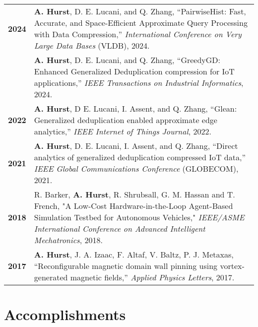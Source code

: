\documentclass[a4paper,11pt]{article}
\begin{document}
\noindent
\begin{tabular}{p{}p{}}
    \textbf{2024} & \textbf{A. Hurst}, D. E. Lucani, and Q. Zhang, “PairwiseHist: Fast, Accurate, and Space-Efficient Approximate Query Processing with Data Compression,” \textit{International Conference on Very Large Data Bases} (VLDB), 2024. \\

     & \textbf{A. Hurst}, D. E. Lucani, and Q. Zhang, “GreedyGD: Enhanced Generalized Deduplication compression for IoT applications,” \textit{IEEE Transactions on Industrial Informatics}, 2024. \\

    \textbf{2022} & \textbf{A. Hurst}, D E. Lucani, I. Assent, and Q. Zhang, “Glean: Generalized deduplication enabled approximate edge analytics,” \textit{IEEE Internet of Things Journal}, 2022. \\

    \textbf{2021} & \textbf{A. Hurst}, D. E. Lucani, I. Assent, and Q. Zhang, ``Direct analytics of generalized deduplication compressed IoT data,'' \textit{IEEE Global Communications Conference} (GLOBECOM), 2021. \\

    \textbf{2018} & R. Barker, \textbf{A. Hurst}, R. Shrubsall, G. M. Hassan and T. French, "A Low-Cost Hardware-in-the-Loop Agent-Based Simulation Testbed for Autonomous Vehicles," \textit{IEEE/ASME International Conference on Advanced Intelligent Mechatronics}, 2018. \\

    \textbf{2017} & \textbf{A. Hurst}, J. A. Izaac, F. Altaf, V. Baltz, P. J. Metaxas, “Reconfigurable magnetic domain wall pinning using vortex-generated magnetic fields,” \textit{Applied Physics Letters}, 2017. \\
\end{tabular}





\section{Accomplishments}
\end{document}
